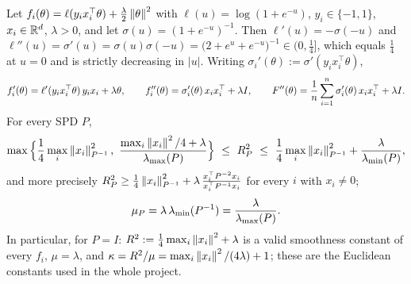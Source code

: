 \begin{lemma}\label{lem:B1-logistic}
Let $f_i(\theta)=\ell(y_ix_i^\top\theta)+\frac\lambda2\left\|\theta\right\|^2$ with $\ell(u)=\log(1+e^{-u})$,
$y_i\in\{-1,1\}$, $x_i\in\mathbb{R}^d$, $\lambda>0$, and let $\sigma(u)=(1+e^{-u})^{-1}$. Then
$\ell'(u)=-\sigma(-u)$ and $\ell''(u)=\sigma'(u)=\sigma(u)\sigma(-u)=\big(2+e^{u}+e^{-u}\big)^{-1}\in(0,\tfrac14]$,
which equals $\frac14$ at $u=0$ and is strictly decreasing in $|u|$. Writing
$\sigma_i'(\theta):=\sigma'(y_ix_i^\top\theta)$,
\begin{equation}\label{eq:B1-logistic-hessians}
f'_i(\theta)=\ell'(y_ix_i^\top\theta)\,y_ix_i+\lambda\theta,\qquad
f_i''(\theta)=\sigma_i'(\theta)\,x_ix_i^\top+\lambda I,\qquad
F''(\theta)=\frac1n\sum_{i=1}^n\sigma_i'(\theta)\,x_ix_i^\top+\lambda I .
\end{equation}
For every SPD $P$,
\begin{equation}\label{eq:B1-logistic-RP}
\max\Big\{\frac14\max_i\norm{x_i}_{P^{-1}}^2,\ \frac{\max_i\norm{x_i}^2/4+\lambda}{\lmax(P)}\Big\}\ \le\ R_P^2\ \le\
\frac14\max_i\norm{x_i}_{P^{-1}}^2+\frac{\lambda}{\lmin(P)} ,
\end{equation}
and more precisely $R_P^2\ge\frac14\left\|x_i\right\|_{P^{-1}}^2+\lambda\,\frac{x_i^\top P^{-2}x_i}{x_i^\top P^{-1}x_i}$
for every $i$ with $x_i\neq0$;
\begin{equation}\label{eq:B1-logistic-muP}
\mu_P=\lambda\,\lambda_{\min}(P^{-1})=\frac{\lambda}{\lambda_{\max}(P)} .
\end{equation}
In particular, for $P=I$: $R^2:=\frac14\max_i\left\|x_i\right\|^2+\lambda$ is a valid smoothness constant of
every $f_i$, $\mu=\lambda$, and $\kappa=R^2/\mu=\max_i\left\|x_i\right\|^2/(4\lambda)+1$; these are the Euclidean
constants used in the whole project.
\end{lemma}
